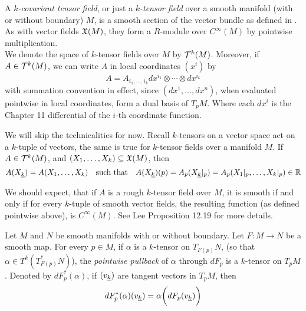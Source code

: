 \documentclass[../main-manifolds.tex]{subfiles}
\begin{document}
\begin{definition}
    A \emph{$k$-covariant tensor field}, or just a \emph{$k$-tensor field} over a smooth manifold (with or without boundary) $M$, is a smooth section of the vector bundle as defined in . As with vector fields $\mathfrak{X}(M)$, they form a $R$-module over $C^\infty(M)$ by pointwise multiplication.\\

    We denote the space of $k$-tensor fields over $M$ by $\mathcal{T}^k(M)$. Moreover, if $A\in \mathcal{T}^k(M)$, we can write $A$ in local coordinates $(x^i)$ by
    \[
        A = A_{i_1,\ldots,i_k}dx^{i_1}\otimes\cdots\otimes dx^{i_k}
    \]
    with summation convention in effect, since $(dx^{1},\ldots,dx^{n})$, when evaluated pointwise in local coordinates, form a dual basis of $T_pM$. Where each $dx^i$ is the Chapter 11 differential of the $i$-th coordinate function.
\end{definition}
We will skip the technicalities for now. Recall $k$-tensors on a vector space act on a $k$-tuple of vectors, the same is true for $k$-tensor fields over a manifold $M$. If $A\in \mathcal{T}^k(M)$, and $(X_1,\ldots, X_k)\subseteq\mathfrak{X}(M)$, then
\[
    A(\Ul{X}[k]) = A(X_1,\ldots,X_k)\quad\text{such that}\quad A(\Ul{X}[k])(p) = A_p(\Ul{X}[k]\vert_{p}) = A_p(X_1\vert_{p},\ldots,X_k\vert_{p})\in\real
\]

We should expect, that if $A$ is a rough $k$-tensor field over $M$, it is smooth if and only if for every $k$-tuple of smooth vector fields, the resulting function (as defined pointwise above), is $C^\infty(M)$. See Lee Proposition 12.19 for more details.


\begin{definition}
    Let $M$ and $N$ be smooth manifolds with or without boundary. Let $F:M\to N$ be a smooth map. For every $p\in M$, if $\alpha$ is a $k$-tensor on $T_{F(p)}N$, (so that $\alpha\in T^k(T_{F(p)}^*N)$), the \emph{pointwise pullback} of $\alpha$ through $dF_p$ is a $k$-tensor on $T_p M$. Denoted by $dF^*_p(\alpha)$, if $(\Ul{v}[k])$ are tangent vectors in $T_pM$, then
    \begin{equation}\label{tensor-field-pointwise-pullback-eq}
        dF^*_p(\alpha)(\Ul{v}[k]) = \alpha\biggl(dF_p(\Ul{v}[k])\biggr)
    \end{equation}
\end{definition}
\end{document}
